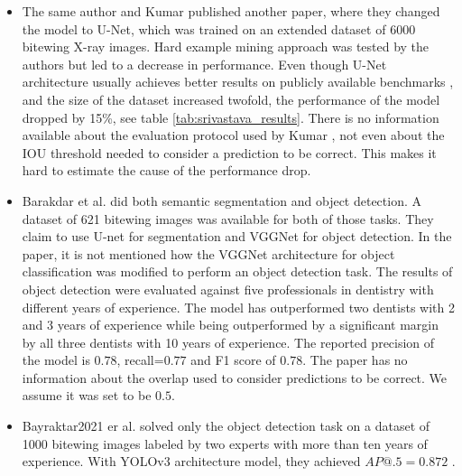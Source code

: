 \begin{itemize}
    \item{The same author and Kumar \cite{Kumar2018}} published another paper, where they changed the model to U-Net, which was trained on an extended dataset of 6000 bitewing X-ray images. Hard example mining approach was tested by the authors but led to a decrease in performance. Even though U-Net architecture usually achieves better results on publicly available benchmarks \cite{paperwithcode, Zhang2019}, and the size of the dataset increased twofold, the performance of the model dropped by 15\%, see table \ref{tab:srivastava_results}. There is no information available about the evaluation protocol used by Kumar \cite{Kumar2018}, not even about the IOU threshold needed to consider a prediction to be correct. This makes it hard to estimate the cause of the performance drop.
    \item{Barakdar et al. \cite{Bayrakdar2021}} did both semantic segmentation and object detection. A dataset of 621 bitewing images was available for both of those tasks. They claim to use U-net for segmentation and VGGNet for object detection. In the paper, it is not mentioned how the VGGNet architecture for object classification was modified to perform an object detection task. The results of object detection were evaluated against five professionals in dentistry with different years of experience. The model has outperformed two dentists with 2 and 3 years of experience while being outperformed by a significant margin by all three dentists with 10 years of experience. The reported precision of the model is $0.78$, recall=$0.77$ and F1 score of $0.78$. The paper has no information about the overlap used to consider predictions to be correct. We assume it was set to be $0.5$.
    \item{Bayraktar2021 er al. \cite{Bayraktar2021}} solved only the object detection task on a dataset of 1000 bitewing images labeled by two experts with more than ten years of experience. With YOLOv3 architecture model, they achieved $AP@.5 = 0.872$ .
\end{itemize}

